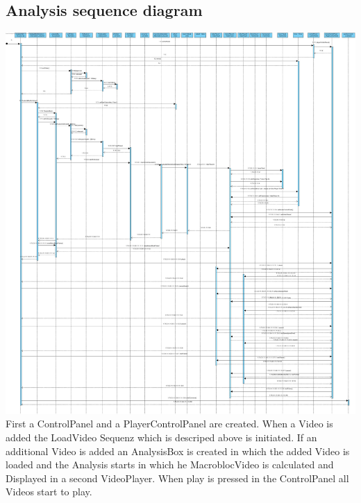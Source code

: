 \documentclass[twoside]{book}
\newcommand{\+}{\discretionary{\mbox{\scriptsize$\hookleftarrow$}}{}{}}
\begin{document}
\subsection*{Analysis sequence diagram}
{\centering\includegraphics[width=1\textwidth]{SequenceDiagram2.jpg}}\\
First a ControlPanel and a PlayerControlPanel are created. When a Video is added the LoadVideo Sequenz which is descriped above is initiated.  If an additional Video is added  
an AnalysisBox is created in which the added Video is loaded and the Analysis starts in which he MacroblocVideo is calculated and Displayed in a second VideoPlayer.
When play is pressed in the ControlPanel all Videos start to play.
\newpage
\end{document}
